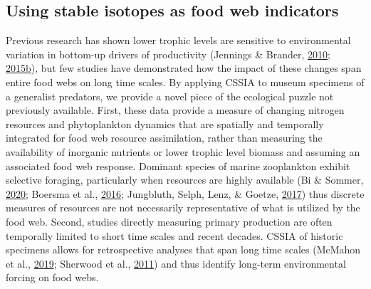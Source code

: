 \documentclass [11pt, proquest] {uwthesis}[2015/03/03]
\begin{document}
\subsection{Using stable isotopes as food web
indicators}\label{using-stable-isotopes-as-food-web-indicators}

Previous research has shown lower trophic levels are sensitive to
environmental variation in bottom-up drivers of productivity (Jennings
\& Brander, \protect\hyperlink{ref-Jennings2010}{2010};
\protect\hyperlink{ref-Frank2015}{2015}\protect\hyperlink{ref-Frank2015}{b}),
but few studies have demonstrated how the impact of these changes span
entire food webs on long time scales. By applying CSSIA to museum
specimens of a generalist predators, we provide a novel piece of the
ecological puzzle not previously available. First, these data provide a
measure of changing nitrogen resources and phytoplankton dynamics that
are spatially and temporally integrated for food web resource
assimilation, rather than measuring the availability of inorganic
nutrients or lower trophic level biomass and assuming an associated food
web response. Dominant species of marine zooplankton exhibit selective
foraging, particularly when resources are highly available (Bi \&
Sommer, \protect\hyperlink{ref-Bi2020}{2020}; Boersma et al.,
\protect\hyperlink{ref-Boersma2015}{2016}; Jungbluth, Selph, Lenz, \&
Goetze, \protect\hyperlink{ref-Jungbluth2017}{2017}) thus discrete
measures of resources are not necessarily representative of what is
utilized by the food web. Second, studies directly measuring primary
production are often temporally limited to short time scales and recent
decades. CSSIA of historic specimens allows for retrospective analyses
that span long time scales (McMahon et al.,
\protect\hyperlink{ref-McMahon2019}{2019}; Sherwood et al.,
\protect\hyperlink{ref-Sherwood2011}{2011}) and thus identify long-term
environmental forcing on food webs.
\end{document}
